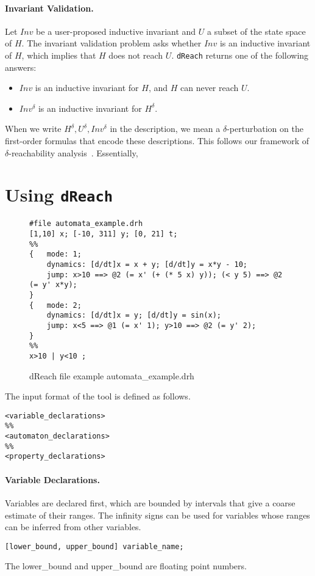\documentclass[envcountsect]{llncs}
\begin{document}
\paragraph{Invariant Validation.} Let $Inv$ be a user-proposed inductive
invariant and $U$ a subset of the state space of $H$. The invariant validation
problem asks whether $Inv$ is an inductive invariant of $H$, which implies that
$H$ does not reach $U$. 
{\tt dReach} returns
one of the following answers:
\begin{itemize}
 \item $Inv$ is an inductive invariant for $H$, and $H$ can never reach $U$.
 \item $Inv^{\delta}$ is an inductive invariant for $H^{\delta}$. 
 \end{itemize}

When we write $H^{\delta}, U^{\delta}, Inv^{\delta}$ in the description, we
mean a $\delta$-perturbation on the first-order formulas that encode these
descriptions. This follows our framework of $\delta$-reachability
analysis~\cite{}. Essentially, 

\section{Using {\tt dReach}}
\begin{figure}[h!]
\label{dreach}
\begin{verbatim}
#file automata_example.drh
[1,10] x; [-10, 311] y; [0, 21] t;
%%
{   mode: 1;
    dynamics: [d/dt]x = x + y; [d/dt]y = x*y - 10;
    jump: x>10 ==> @2 (= x' (+ (* 5 x) y)); (< y 5) ==> @2 (= y' x*y);
}
{   mode: 2;
    dynamics: [d/dt]x = y; [d/dt]y = sin(x);
    jump: x<5 ==> @1 (= x' 1); y>10 ==> @2 (= y' 2);
}    
%%
x>10 | y<10 ;
\end{verbatim}
\caption{dReach file example automata\_example.drh}
\end{figure}

The input format of the tool is defined as follows. 
\begin{verbatim}
<variable_declarations>
%%
<automaton_declarations>
%%
<property_declarations>
\end{verbatim}

\paragraph{Variable Declarations.} Variables are declared first, which are
bounded by intervals that give a coarse estimate of their ranges. The infinity
signs can be used for variables whose ranges can be inferred from other
variables.
\begin{verbatim}
[lower_bound, upper_bound] variable_name;
\end{verbatim}
The lower\_bound and upper\_bound are floating point numbers. 
\end{document}
